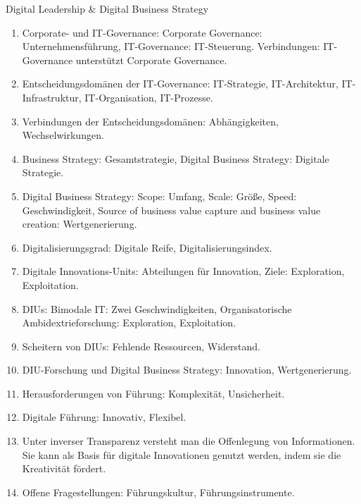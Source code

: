 \documentclass{article}
\begin{document}
\begin{exercise}{Digital Leadership \& Digital Business Strategy}
  \begin{solution}
    \begin{enumerate}
      \item Corporate- und IT-Governance: Corporate Governance: Unternehmensführung, IT-Governance: IT-Steuerung. Verbindungen: IT-Governance unterstützt Corporate Governance.
      \item Entscheidungsdomänen der IT-Governance: IT-Strategie, IT-Architektur, IT-Infrastruktur, IT-Organisation, IT-Prozesse.
      \item Verbindungen der Entscheidungsdomänen: Abhängigkeiten, Wechselwirkungen.
      \item Business Strategy: Gesamtstrategie, Digital Business Strategy: Digitale Strategie.
      \item Digital Business Strategy: Scope: Umfang, Scale: Größe, Speed: Geschwindigkeit, Source of business value capture and business value creation: Wertgenerierung.
      \item Digitalisierungsgrad: Digitale Reife, Digitalisierungsindex.
      \item Digitale Innovations-Units: Abteilungen für Innovation, Ziele: Exploration, Exploitation.
      \item DIUs: Bimodale IT: Zwei Geschwindigkeiten, Organisatorische Ambidextrieforschung: Exploration, Exploitation.
      \item Scheitern von DIUs: Fehlende Ressourcen, Widerstand.
      \item DIU-Forschung und Digital Business Strategy: Innovation, Wertgenerierung.
      \item Herausforderungen von Führung: Komplexität, Unsicherheit.
      \item Digitale Führung: Innovativ, Flexibel.
      \item Unter inverser Transparenz versteht man die Offenlegung von Informationen. Sie kann als Basis für digitale Innovationen genutzt werden, indem sie die Kreativität fördert.
      \item Offene Fragestellungen: Führungskultur, Führungsinstrumente.
    \end{enumerate}
  \end{solution}
\end{exercise}
\end{document}
